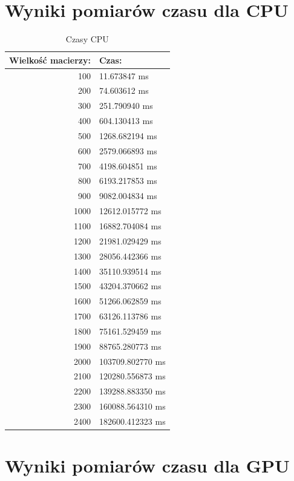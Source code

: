 \documentclass[a4paper,12pt,oneside]{article}
\begin{document}
\section{Wyniki pomiarów czasu dla CPU}
\begin{table}[H]
\caption{Czasy CPU}
\label{Tabela wyników - CPU}
\begin{center}
\begin{tabular}{|r|l|}
  \hline 
  Wielkość macierzy: & Czas: \\
  \hline 
100 & 11.673847 ms \\
200 & 74.603612 ms \\
300 & 251.790940 ms \\
400 & 604.130413 ms \\
500 & 1268.682194 ms \\
600 & 2579.066893 ms \\
700 & 4198.604851 ms \\
800 & 6193.217853 ms \\
900 & 9082.004834 ms \\
1000 & 12612.015772 ms \\
1100 & 16882.704084 ms \\
1200 & 21981.029429 ms \\
1300 & 28056.442366 ms \\
1400 & 35110.939514 ms \\
1500 & 43204.370662 ms \\
1600 & 51266.062859 ms \\
1700 & 63126.113786 ms \\
1800 & 75161.529459 ms \\
1900 & 88765.280773 ms \\
2000 & 103709.802770 ms \\
2100 & 120280.556873 ms \\
2200 & 139288.883350 ms \\
2300 & 160088.564310 ms \\
2400 & 182600.412323 ms \\
\hline 
\end{tabular}
\end{center}
\end{table}

\section{Wyniki pomiarów czasu dla GPU}
\end{document}
